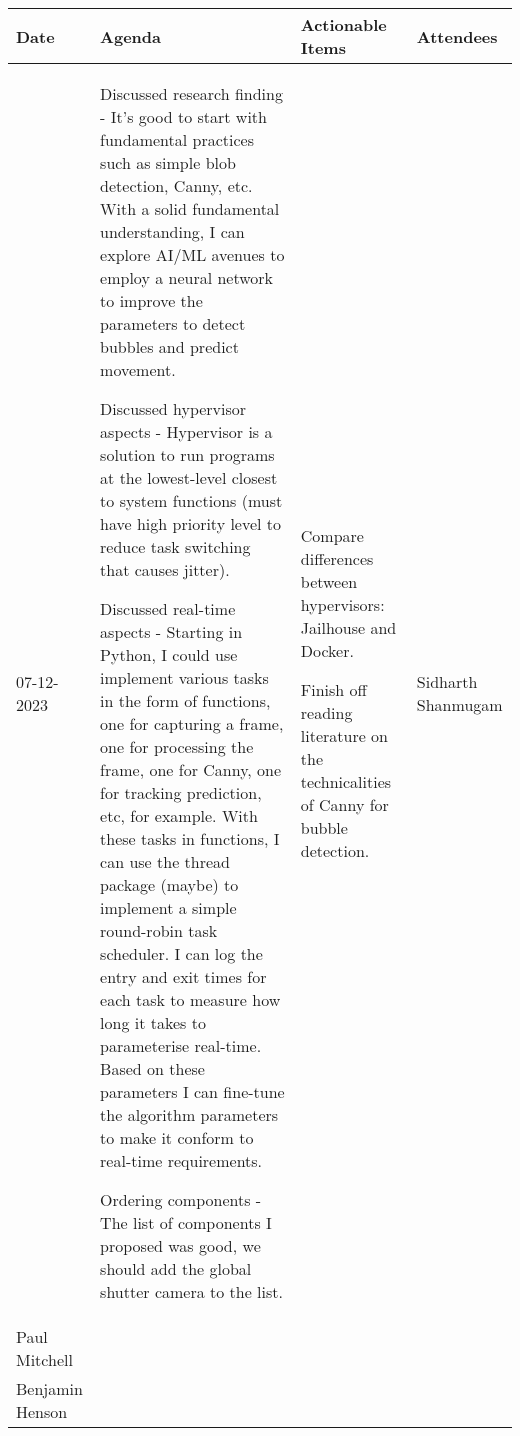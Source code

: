 \begin{table}[!h]
    \centering
    \begin{tabularx}{\textwidth}{|l|X|X|X|}
        \hline
        Date & Agenda & Actionable Items & Attendees \\
        \hline
        \hline
        07-12-2023 & 
        \begin{myitemize}
            \item Discussed research finding - It's good to start with fundamental practices such as simple blob detection, Canny, etc. With a solid fundamental understanding, I can explore AI/ML avenues to employ a neural network to improve the parameters to detect bubbles and predict movement.
            \item Discussed hypervisor aspects - Hypervisor is a solution to run programs at the lowest-level closest to system functions (must have high priority level to reduce task switching that causes jitter).
            \item Discussed real-time aspects - Starting in Python, I could use implement various tasks in the form of functions, one for capturing a frame, one for processing the frame, one for Canny, one for tracking prediction, etc, for example. With these tasks in functions, I can use the thread package (maybe) to implement a simple round-robin task scheduler. I can log the entry and exit times for each task to measure how long it takes to parameterise real-time. Based on these parameters I can fine-tune the algorithm parameters to make it conform to real-time requirements.
            \item Ordering components - The list of components I proposed was good, we should add the global shutter camera to the list.
        \end{myitemize} &
        \begin{myitemize}
            \item Compare differences between hypervisors: Jailhouse and Docker.
            \item Finish off reading literature on the technicalities of Canny for bubble detection.
        \end{myitemize} &
        Sidharth Shanmugam \\
        Paul Mitchell \\
        Benjamin Henson
        \hline
    \end{tabularx}
\end{table}
